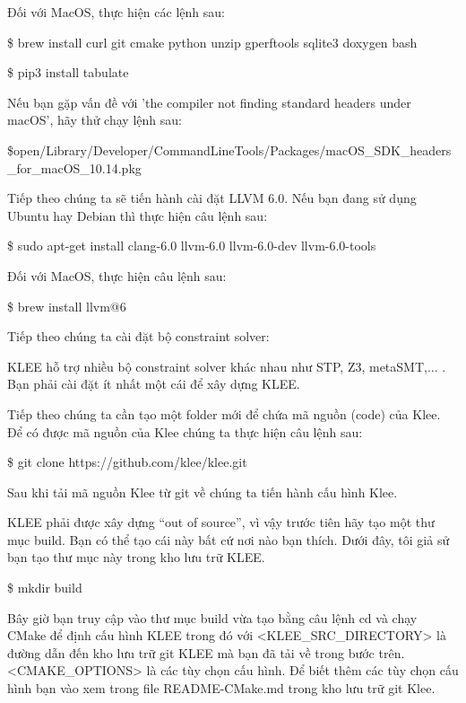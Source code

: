 \documentclass[12pt,a4paper]{article}
\begin{document}
Đối với MacOS, thực hiện các lệnh sau:

\begin{framed}
\$ brew install curl git cmake python unzip gperftools sqlite3 doxygen bash

\$ pip3 install tabulate
\end{framed}

Nếu bạn gặp vấn đề với 'the compiler not finding standard headers under macOS', hãy thử chạy lệnh sau:

\begin{framed}
\$open/Library/Developer/CommandLineTools/Packages/macOS\_SDK\_headers \_for\_macOS\_10.14.pkg
\end{framed}

Tiếp theo chúng ta sẽ tiến hành cài đặt LLVM 6.0. Nếu bạn đang sử dụng Ubuntu hay Debian thì thực hiện câu lệnh sau:

\begin{framed}
\$ sudo apt-get install clang-6.0 llvm-6.0 llvm-6.0-dev llvm-6.0-tools
\end{framed}

Đối với MacOS, thực hiện câu lệnh sau:

\begin{framed}
\$ brew install llvm@6
\end{framed}

Tiếp theo chúng ta cài đặt bộ constraint solver:

KLEE hỗ trợ nhiều bộ constraint solver khác nhau như STP, Z3, metaSMT,... . Bạn phải cài đặt ít nhất một cái để xây dựng KLEE.

Tiếp theo chúng ta cần tạo một folder mới để chứa mã nguồn (code) của Klee. Để có được mã nguồn của Klee chúng ta thực hiện câu lệnh sau:

\begin{framed}
\$ git clone https://github.com/klee/klee.git
\end{framed}

Sau khi tải mã nguồn Klee từ git về chúng ta tiến hành cấu hình Klee.

KLEE phải được xây dựng “out of source”, vì vậy trước tiên hãy tạo một thư mục build. Bạn có thể tạo cái này bất cứ nơi nào bạn thích. Dưới đây, tôi giả sử bạn tạo thư mục này trong kho lưu trữ KLEE.

\begin{framed}
\$ mkdir build
\end{framed}

Bây giờ bạn truy cập vào thư mục build vừa tạo bằng câu lệnh cd và chạy CMake để định cấu hình KLEE trong đó với <KLEE\_SRC\_DIRECTORY> là đường dẫn đến kho lưu trữ git KLEE mà bạn đã tải về trong bước trên. <CMAKE\_OPTIONS> là các tùy chọn cấu hình. Để biết thêm các tùy chọn cấu hình bạn vào xem trong file README-CMake.md trong kho lưu trữ git Klee.
\end{document}
